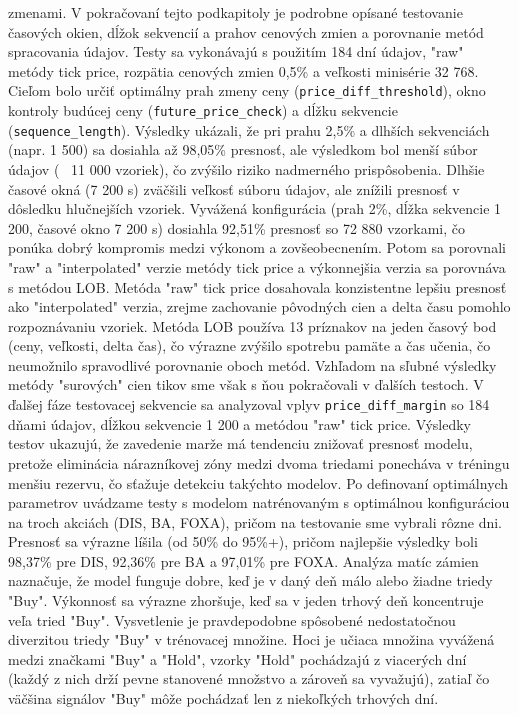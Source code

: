 \documentclass[a4paper,oneside,onecolumn,12pt]{book}
\begin{document}
zmenami. V pokračovaní tejto podkapitoly je podrobne opísané testovanie časových okien, dĺžok sekvencií a prahov cenových zmien a porovnanie metód spracovania údajov. Testy sa vykonávajú s použitím 184 dní údajov, "raw" metódy tick price, rozpätia cenových zmien 0,5\% a veľkosti minisérie 32 768. Cieľom bolo určiť optimálny prah zmeny ceny (\texttt{price\_diff\_threshold}), okno kontroly budúcej ceny (\texttt{future\_price\_check}) a dĺžku sekvencie (\texttt{sequence\_length}). Výsledky ukázali, že pri prahu 2,5\% a dlhších sekvenciách (napr. 1 500) sa dosiahla až 98,05\% presnosť, ale výsledkom bol menší súbor údajov (~ 11 000 vzoriek), čo zvýšilo riziko nadmerného prispôsobenia. Dlhšie časové okná (7 200 s) zväčšili veľkosť súboru údajov, ale znížili presnosť v dôsledku hlučnejších vzoriek. Vyvážená konfigurácia (prah 2\%, dĺžka sekvencie 1 200, časové okno 7 200 s) dosiahla 92,51\% presnosť so 72 880 vzorkami, čo ponúka dobrý kompromis medzi výkonom a zovšeobecnením. Potom sa porovnali "raw" a "interpolated" verzie metódy tick price a výkonnejšia verzia sa porovnáva s metódou LOB. Metóda "raw" tick price dosahovala konzistentne lepšiu presnosť ako "interpolated" verzia, zrejme zachovanie pôvodných cien a delta času pomohlo rozpoznávaniu vzoriek. Metóda LOB používa 13 príznakov na jeden časový bod (ceny, veľkosti, delta čas), čo výrazne zvýšilo spotrebu pamäte a čas učenia, čo neumožnilo spravodlivé porovnanie oboch metód. Vzhľadom na sľubné výsledky metódy "surových" cien tikov sme však s ňou pokračovali v ďalších testoch. V ďalšej fáze testovacej sekvencie sa analyzoval vplyv \texttt{price\_diff\_margin} so 184 dňami údajov, dĺžkou sekvencie 1 200 a metódou "raw" tick price. Výsledky testov ukazujú, že zavedenie marže má tendenciu znižovať presnosť modelu, pretože eliminácia nárazníkovej zóny medzi dvoma triedami ponecháva v tréningu menšiu rezervu, čo sťažuje detekciu takýchto modelov. Po definovaní optimálnych parametrov uvádzame testy s modelom natrénovaným s optimálnou konfiguráciou na troch akciách (DIS, BA, FOXA), pričom na testovanie sme vybrali rôzne dni. Presnosť sa výrazne líšila (od 50\% do 95\%+), pričom najlepšie výsledky boli 98,37\% pre DIS, 92,36\% pre BA a 97,01\% pre FOXA. Analýza matíc zámien naznačuje, že model funguje dobre, keď je v daný deň málo alebo žiadne triedy "Buy". Výkonnosť sa výrazne zhoršuje, keď sa v jeden trhový deň koncentruje veľa tried "Buy". Vysvetlenie je pravdepodobne spôsobené nedostatočnou diverzitou triedy "Buy" v trénovacej množine. Hoci je učiaca množina vyvážená medzi značkami "Buy" a "Hold", vzorky "Hold" pochádzajú z viacerých dní (každý z nich drží pevne stanovené množstvo a zároveň sa vyvažujú), zatiaľ čo väčšina signálov "Buy" môže pochádzať len z niekoľkých trhových dní.
\end{document}

